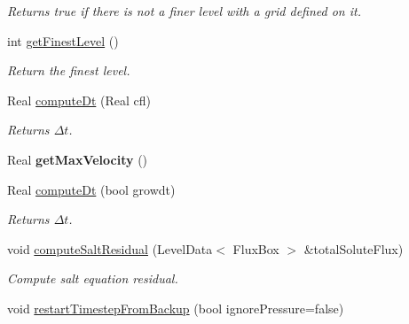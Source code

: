 \begin{DoxyCompactItemize}
\begin{DoxyCompactList}\small\item\em Returns true if there is not a finer level with a grid defined on it. \end{DoxyCompactList}\item 
\hypertarget{class_a_m_r_level_mushy_layer_a52cfb93ecc1e44063a1db80fb417017b}{int \hyperlink{class_a_m_r_level_mushy_layer_a52cfb93ecc1e44063a1db80fb417017b}{get\-Finest\-Level} ()}\label{class_a_m_r_level_mushy_layer_a52cfb93ecc1e44063a1db80fb417017b}

\begin{DoxyCompactList}\small\item\em Return the finest level. \end{DoxyCompactList}\item 
\hypertarget{class_a_m_r_level_mushy_layer_a38c3d474a125f8cf66dd07e08ee02709}{Real \hyperlink{class_a_m_r_level_mushy_layer_a38c3d474a125f8cf66dd07e08ee02709}{compute\-Dt} (Real cfl)}\label{class_a_m_r_level_mushy_layer_a38c3d474a125f8cf66dd07e08ee02709}

\begin{DoxyCompactList}\small\item\em Returns $ \Delta t $. \end{DoxyCompactList}\item 
\hypertarget{class_a_m_r_level_mushy_layer_aa758dba965ec2072e89a8bb75620db1b}{Real {\bfseries get\-Max\-Velocity} ()}\label{class_a_m_r_level_mushy_layer_aa758dba965ec2072e89a8bb75620db1b}

\item 
\hypertarget{class_a_m_r_level_mushy_layer_a3eee3de4d8921d0778ed037698c5d5c4}{Real \hyperlink{class_a_m_r_level_mushy_layer_a3eee3de4d8921d0778ed037698c5d5c4}{compute\-Dt} (bool growdt)}\label{class_a_m_r_level_mushy_layer_a3eee3de4d8921d0778ed037698c5d5c4}

\begin{DoxyCompactList}\small\item\em Returns $ \Delta t $. \end{DoxyCompactList}\item 
\hypertarget{class_a_m_r_level_mushy_layer_aa98ba6180396656e312b6449f4ebd8eb}{void \hyperlink{class_a_m_r_level_mushy_layer_aa98ba6180396656e312b6449f4ebd8eb}{compute\-Salt\-Residual} (Level\-Data$<$ Flux\-Box $>$ \&total\-Solute\-Flux)}\label{class_a_m_r_level_mushy_layer_aa98ba6180396656e312b6449f4ebd8eb}

\begin{DoxyCompactList}\small\item\em Compute salt equation residual. \end{DoxyCompactList}\item 
\hypertarget{class_a_m_r_level_mushy_layer_adaba898a184c0cd44d6d1b12f52ef503}{void \hyperlink{class_a_m_r_level_mushy_layer_adaba898a184c0cd44d6d1b12f52ef503}{restart\-Timestep\-From\-Backup} (bool ignore\-Pressure=false)}\label{class_a_m_r_level_mushy_layer_adaba898a184c0cd44d6d1b12f52ef503}


\end{DoxyCompactItemize}
